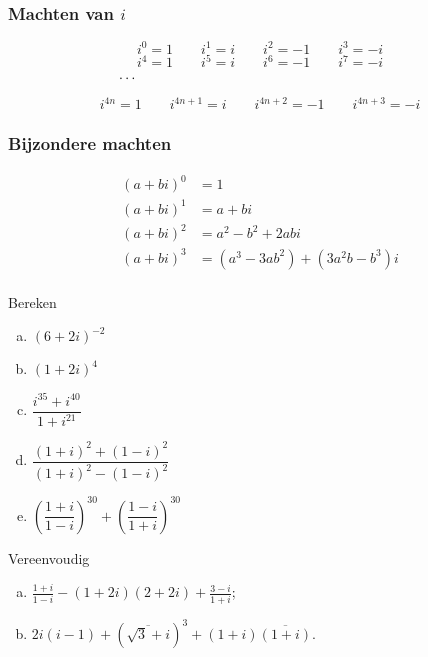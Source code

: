 \documentclass[12pt,twoside,a4paper]{article}
\begin{document}
\subsubsection*{Machten van $i$}
$$i^0=1 \qquad i^1=i \qquad i^2=-1 \qquad i^3=-i$$
$$i^4=1 \qquad i^5=i \qquad i^6=-1 \qquad i^7=-i$$
$$\cdots\hspace*{6.7cm}$$

\begin{center}
\end{center}

$$i^{4n}=1 \qquad i^{4n+1}=i \qquad i^{4n+2}=-1 \qquad i^{4n+3}=-i$$

\subsubsection*{Bijzondere machten}
\begin{align*}
  (a+bi)^0 &= 1\\
  (a+bi)^1 &= a+bi\\
  (a+bi)^2 &= a^2-b^2 + 2abi\\
  (a+bi)^3 &= (a^3 - 3ab^2) + (3a^2b -b^3)i\\
\end{align*}


\begin{oefening}
  Bereken
  \begin{enumerate}[(a)]
    \itemsep1em
  \item $\displaystyle \left(6+2i\right)^{-2}$
  \item $\displaystyle \left(1+2i\right)^4$
  \item $\displaystyle \dfrac{i^{35}+i^{40}}{1+i^{21}}$
  \item $\displaystyle \dfrac{(1+i)^2+(1-i)^2}{(1+i)^2-(1-i)^2}$
  \item $\displaystyle \left(\dfrac{1+i}{1-i}\right)^{30}+\left(\dfrac{1-i}{1+i}\right)^{30}$
  \end{enumerate}
\end{oefening}

\begin{oefening}
  Vereenvoudig
  \begin{enumerate}[(a)]
    \itemsep 1em
  \item $\frac{1+i}{1-i}-(1+2i)(2+2i)+\frac{3-i}{1+i}$;
  \item $2i(i-1)+\left(\overline{\sqrt{3}+i}\right)^3+(1+i)\overline{(1+i)}.$
  \end{enumerate}
\end{oefening}
\end{document}
